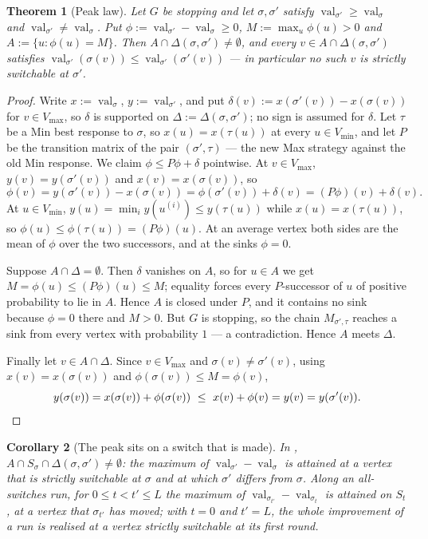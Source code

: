 \documentclass[11pt]{article}
\theoremstyle{plain}
\newtheorem{theorem}{Theorem}[section]
\newtheorem{corollary}[theorem]{Corollary}
\theoremstyle{definition}
\DeclareMathOperator{\val}{val}
\newcommand{\Vmax}{V_{\max}}
\newcommand{\Vmin}{V_{\min}}
\begin{document}
\begin{theorem}[Peak law]\label{thm:peak-law}
Let $G$ be stopping and let $\sigma,\sigma'$ satisfy
$\val_{\sigma'}\ge\val_\sigma$ and $\val_{\sigma'}\ne\val_\sigma$. Put
$\phi:=\val_{\sigma'}-\val_\sigma\ge0$, $M:=\max_u\phi(u)>0$ and
$A:=\{u:\phi(u)=M\}$. Then $A\cap\Delta(\sigma,\sigma')\ne\emptyset$, and
every $v\in A\cap\Delta(\sigma,\sigma')$ satisfies
$\val_{\sigma'}(\sigma(v))\le\val_{\sigma'}(\sigma'(v))$ --- in
particular no such $v$ is strictly switchable at $\sigma'$.
\end{theorem}

\begin{proof}
Write $x:=\val_\sigma$, $y:=\val_{\sigma'}$, and put
$\delta(v):=x(\sigma'(v))-x(\sigma(v))$ for $v\in\Vmax$, so $\delta$ is
supported on $\Delta:=\Delta(\sigma,\sigma')$; no sign is assumed for
$\delta$. Let $\tau$ be a Min best response to $\sigma$, so
$x(u)=x(\tau(u))$ at every $u\in\Vmin$, and let $P$ be the transition
matrix of the pair $(\sigma',\tau)$ --- the new Max strategy against the
old Min response. We claim $\phi\le P\phi+\delta$ pointwise. At
$v\in\Vmax$, $y(v)=y(\sigma'(v))$ and $x(v)=x(\sigma(v))$, so
\[
  \phi(v)=y(\sigma'(v))-x(\sigma(v))=\phi(\sigma'(v))+\delta(v)=(P\phi)(v)+\delta(v).
\]
At $u\in\Vmin$, $y(u)=\min_i y(u^{(i)})\le y(\tau(u))$ while
$x(u)=x(\tau(u))$, so $\phi(u)\le\phi(\tau(u))=(P\phi)(u)$. At an average
vertex both sides are the mean of $\phi$ over the two successors, and at
the sinks $\phi=0$.

Suppose $A\cap\Delta=\emptyset$. Then $\delta$ vanishes on $A$, so for
$u\in A$ we get $M=\phi(u)\le(P\phi)(u)\le M$; equality forces every
$P$-successor of $u$ of positive probability to lie in $A$. Hence $A$ is
closed under $P$, and it contains no sink because $\phi=0$ there and
$M>0$. But $G$ is stopping, so the chain $M_{\sigma',\tau}$ reaches a
sink from every vertex with probability $1$ --- a contradiction. Hence
$A$ meets $\Delta$.

Finally let $v\in A\cap\Delta$. Since $v\in\Vmax$ and
$\sigma(v)\ne\sigma'(v)$, using $x(v)=x(\sigma(v))$ and
$\phi(\sigma(v))\le M=\phi(v)$,
\[
  y(\sigma(v))=x(\sigma(v))+\phi(\sigma(v))\ \le\ x(v)+\phi(v)=y(v)=y(\sigma'(v)).\qedhere
\]
\end{proof}

\begin{corollary}[The peak sits on a switch that is made]\label{cor:peak-sharp}
In , $A\cap S_\sigma\cap\Delta(\sigma,\sigma')\ne\emptyset$:
the maximum of $\val_{\sigma'}-\val_\sigma$ is attained at a vertex that is
strictly switchable at $\sigma$ and at which $\sigma'$ differs from
$\sigma$. Along an all-switches run, for $0\le t<t'\le L$ the maximum of
$\val_{\sigma_{t'}}-\val_{\sigma_t}$ is attained on $S_t$, at a vertex
that $\sigma_{t'}$ has moved; with $t=0$ and $t'=L$, the whole improvement
of a run is realised at a vertex strictly switchable at its first round.
\end{corollary}
\end{document}
